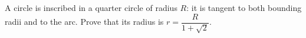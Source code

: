 A circle is inscribed in a quarter circle of radius $R$: it is tangent to both bounding radii and to the arc. Prove that its radius is $r=\dfrac{R}{1+\sqrt2}$.
